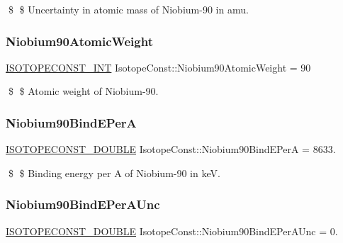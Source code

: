 \$ \$ Uncertainty in atomic mass of Niobium-\/90 in amu. \mbox{\label{group___isotope_const-_niobium-_nb90_ga02ab0ee313a8feb388ab3d25ad70b0c1}} 
\subsubsection{\texorpdfstring{Niobium90\+Atomic\+Weight}{Niobium90AtomicWeight}}
{\footnotesize\ttfamily \mbox{\hyperlink{group___isotope_const-_macros_ga5f18360b3e99483a35c32d789e62621c}{I\+S\+O\+T\+O\+P\+E\+C\+O\+N\+S\+T\+\_\+\+I\+NT}} Isotope\+Const\+::\+Niobium90\+Atomic\+Weight = 90}

\$ \$ Atomic weight of Niobium-\/90. \mbox{\label{group___isotope_const-_niobium-_nb90_ga031b5025536fb9604f22ef1d60fde400}} 
\subsubsection{\texorpdfstring{Niobium90\+Bind\+E\+PerA}{Niobium90BindEPerA}}
{\footnotesize\ttfamily \mbox{\hyperlink{group___isotope_const-_macros_ga8f45a7272ce02c0b4c65c44636ed719a}{I\+S\+O\+T\+O\+P\+E\+C\+O\+N\+S\+T\+\_\+\+D\+O\+U\+B\+LE}} Isotope\+Const\+::\+Niobium90\+Bind\+E\+PerA = 8633.}

\$ \$ Binding energy per A of Niobium-\/90 in keV. \mbox{\label{group___isotope_const-_niobium-_nb90_gae8fb8eac8a6cc16a4624182364338fa7}} 
\subsubsection{\texorpdfstring{Niobium90\+Bind\+E\+Per\+A\+Unc}{Niobium90BindEPerAUnc}}
{\footnotesize\ttfamily \mbox{\hyperlink{group___isotope_const-_macros_ga8f45a7272ce02c0b4c65c44636ed719a}{I\+S\+O\+T\+O\+P\+E\+C\+O\+N\+S\+T\+\_\+\+D\+O\+U\+B\+LE}} Isotope\+Const\+::\+Niobium90\+Bind\+E\+Per\+A\+Unc = 0.}

